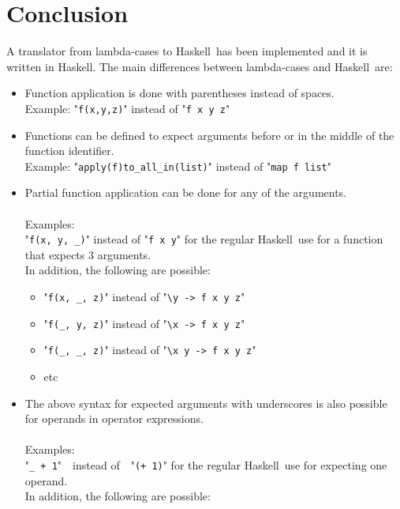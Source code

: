 \documentclass[diploma]{softlab-thesis}
\def\H{Haskell}
\begin{document}
\newpage
\chapter{Conclusion}

A translator from lambda-cases to \H\ has been implemented and it is written in
\H. The main differences between lambda-cases and \H\ are:

\begin{itemize}

\item
Function application is done with parentheses instead of spaces. \\
Example: "\verb|f(x,y,z)|" instead of "\verb|f x y z|"

\item
Functions can be defined to expect arguments before or in the middle of the
function identifier. \\
Example:
"\verb|apply(f)to_all_in(list)|" instead of "\verb|map f list|"

\item
Partial function application can be done for any of the arguments.
\\\\
Examples:\\
"\verb|f(x, y, _)|" instead of "\verb|f x y|" for the regular \H\ use for
a function that expects 3 arguments.
\\
In addition, the following are possible:

\begin{itemize}

\item
"\verb|f(x, _, z)|" instead of "\verb|\y -> f x y z|"

\item
"\verb|f(_, y, z)|" instead of "\verb|\x -> f x y z|"

\item
"\verb|f(_, _, z)|" instead of "\verb|\x y -> f x y z|"

\item
etc

\end{itemize}

\item
The above syntax for expected arguments with underscores is also possible
for operands in operator expressions.
\\\\
Examples:\\
"\verb|_ + 1|"\ \ instead of\ \  "\verb|(+ 1)|" for the regular \H\ use for expecting
one operand.
\\
In addition, the following are possible:


\end{itemize}
\end{document}
